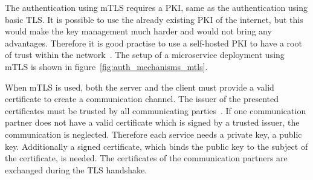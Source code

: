 The authentication using mTLS requires a PKI, same as the authentication using basic TLS.
It is possible to use the already existing PKI of the internet, but this would make the key management much harder and would not bring any advantages.
Therefore it is good practise to use a self-hosted PKI to have a root of trust within the network~\cite{dias2020microservices}.
The setup of a microservice deployment using mTLS is shown in figure~\ref{fig:auth_mechanisms_mtls}.

When mTLS is used, both the server and the client must provide a valid certificate to create a communication channel.
The issuer of the presented certificates must be trusted by all communicating parties~\cite{dias2020microservices}.
If one communication partner does not have a valid certificate which is signed by a trusted issuer, the communication is neglected.
Therefore each service needs a private key, a public key.
Additionally a signed certificate, which binds the public key to the subject of the certificate, is needed.
The certificates of the communication partners are exchanged during the TLS handshake.

